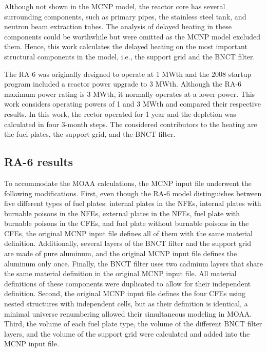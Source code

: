 \documentclass{style/nseJournal}
\providecommand{\DIFadd}[1]{{\protect\color{blue}\uwave{#1}}} %
\providecommand{\DIFdel}[1]{{\protect\color{red}\sout{#1}}}                      %
\providecommand{\DIFaddbegin}{} %
\providecommand{\DIFaddend}{} %
\providecommand{\DIFdelbegin}{} %
\providecommand{\DIFdelend}{} %
\begin{document}
Although not shown in the MCNP model, the reactor core has several surrounding components, such as primary pipes, the stainless steel tank, and neutron beam extraction tubes.
The analysis of delayed heating in these components could be worthwhile but were omitted as the MCNP model excluded them.
Hence, this work calculates the delayed heating on the most important structural components in the model, i.e., the support grid and the BNCT filter.

The RA-6 was originally designed to operate at 1 MWth and the 2008 startup program included a reactor power upgrade to 3 MWth.
Although the RA-6 maximum power rating is 3 MWth, it normally operates at a lower power.
This work considers operating powers of 1 and 3 MWth and compared their respective results.
In this work, the \DIFdelbegin \DIFdel{rector }\DIFdelend \DIFaddbegin \DIFadd{reactor }\DIFaddend operated for 1 year and the depletion was calculated in four 3-month steps.
The considered contributors to the heating are the fuel plates, the support grid, and the BNCT filter.


\subsection{RA-6 results}

To accommodate the MOAA calculations, the MCNP input file underwent the following modifications.
First, even though the RA-6 model distinguishes between five different types of fuel plates: internal plates in the NFEs, internal plates with burnable poisons in the NFEs, external plates in the NFEs, fuel plate with burnable poisons in the CFEs, and fuel plate without burnable poisons in the CFEs, the original MCNP input file defines all of them with the same material definition.
Additionally, several layers of the BNCT filter and the support grid are made of pure aluminum, and the original MCNP input file defines the aluminum only once.
Finally, the BNCT filter uses two cadmium layers that share the same material definition in the original MCNP input file.
All material definitions of these components were duplicated to allow for their independent definition.
Second, the original MCNP input file defines the four CFEs using nested structures with independent cells, but as their definition is identical, a minimal universe renumbering allowed their simultaneous modeling in MOAA.
Third, the volume of each fuel plate type, the volume of the different BNCT filter layers, and the volume of the support grid were calculated and added into the MCNP input file.
\end{document}
